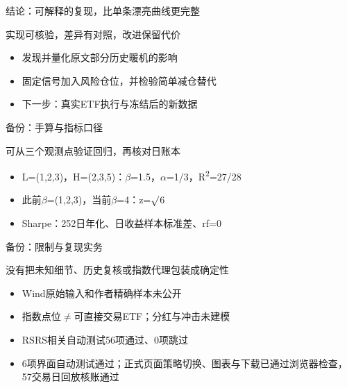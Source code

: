 \documentclass[aspectratio=169,10pt]{beamer}
\begin{document}
\begin{frame}{结论：可解释的复现，比单条漂亮曲线更完整}
\begin{block}{}实现可核验，差异有对照，改进保留代价\end{block}
\small\begin{itemize}
\item 发现并量化原文部分历史暖机的影响
\item 固定信号加入风险仓位，并检验简单减仓替代
\item 下一步：真实ETF执行与冻结后的新数据
\end{itemize}
\end{frame}
\begin{frame}{备份：手算与指标口径}
\begin{block}{}可从三个观测点验证回归，再核对日账本\end{block}
\small\begin{itemize}
\item L=(1,2,3)，H=(2,3,5)：\ensuremath{\beta}=1.5，\ensuremath{\alpha}=1/3，R\textsuperscript{2}=27/28
\item 此前\ensuremath{\beta}=(1,2,3)，当前\ensuremath{\beta}=4：z=\ensuremath{\surd}6
\item Sharpe：252日年化、日收益样本标准差、rf=0
\end{itemize}
\end{frame}
\begin{frame}{备份：限制与复现实务}
\begin{block}{}没有把未知细节、历史复核或指数代理包装成确定性\end{block}
\small\begin{itemize}
\item Wind原始输入和作者精确样本未公开
\item 指数点位\ensuremath{\ne}可直接交易ETF；分红与冲击未建模
\item RSRS相关自动测试56项通过、0项跳过
\item 6项界面自动测试通过；正式页面策略切换、图表与下载已通过浏览器检查，57交易日回放核账通过
\end{itemize}
\end{frame}
\end{document}

